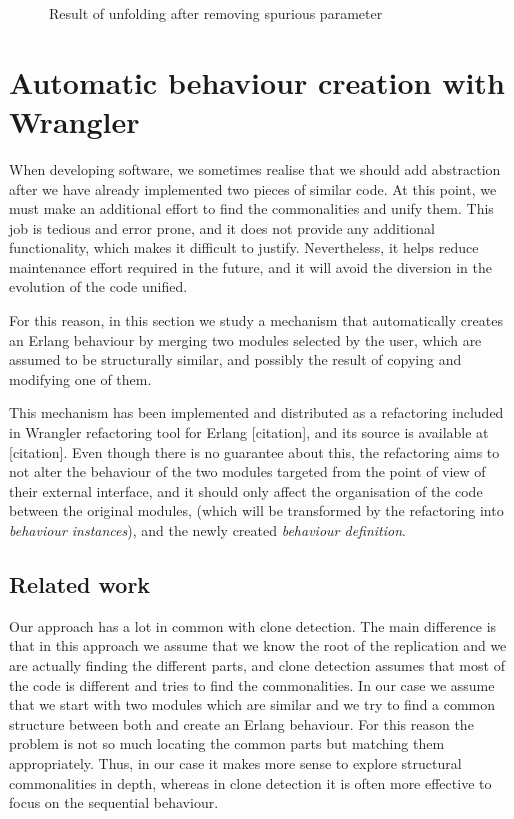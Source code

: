 \begin{figure}
\label{fig:final_result}

\caption{Result of unfolding after removing spurious parameter}
\end{figure}

\section{Automatic behaviour creation with Wrangler}

When developing software, we sometimes realise that we should add
abstraction after we have already implemented two pieces of similar
code. At this point, we must make an additional effort to find the
commonalities and unify them. This job is tedious and error prone,
and it does not provide any additional functionality, which makes
it difficult to justify. Nevertheless, it helps reduce maintenance
effort required in the future, and it will avoid the diversion in
the evolution of the code unified.

For this reason, in this section we study a mechanism that automatically
creates an Erlang behaviour by merging two modules selected by the
user, which are assumed to be structurally similar, and possibly the
result of copying and modifying one of them.

This mechanism has been implemented and distributed as a refactoring
included in Wrangler refactoring tool for Erlang {[}citation{]}, and
its source is available at {[}citation{]}. Even though there is no
guarantee about this, the refactoring aims to not alter the behaviour
of the two modules targeted from the point of view of their external
interface, and it should only affect the organisation of the code
between the original modules, (which will be transformed by the refactoring
into \emph{behaviour instances}), and the newly created \emph{behaviour
definition}.


\subsection{Related work}

Our approach has a lot in common with clone detection. The main difference
is that in this approach we assume that we know the root of the replication
and we are actually finding the different parts, and clone detection
assumes that most of the code is different and tries to find the commonalities.
In our case we assume that we start with two modules which are similar
and we try to find a common structure between both and create an Erlang
behaviour. For this reason the problem is not so much locating the
common parts but matching them appropriately. Thus, in our case it
makes more sense to explore structural commonalities in depth, whereas
in clone detection it is often more effective to focus on the sequential
behaviour.

